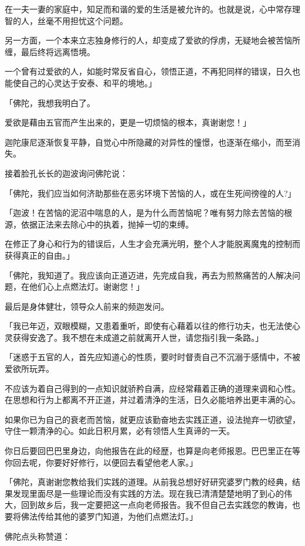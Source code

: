 \documentclass[twoside,openany]{book}
\begin{document}
在一夫一妻的家庭中，知足而和谐的爱的生活是被允许的。也就是说，心中常存理智的人，丝毫不用担忧这个问题。

另一方面，一个本来立志独身修行的人，却变成了爱欲的俘虏，无疑地会被苦恼所缠，最后终将远离悟境。

一个曾有过爱欲的人，如能时常反省自心，领悟正道，不再犯同样的错误，日久也能使自己的心灵达于安泰、和平的境地。」

「佛陀，我想我明白了。

爱欲是藉由五官而产生出来的，更是一切烦恼的根本，真谢谢您！」

迦陀康尼逐渐恢复平静，自觉心中所隐藏的对异性的憧憬，也逐渐在缩小，而至消失。

接着脸孔长长的迦波询问佛陀说：

「佛陀，我们应当如何济助那些在恶劣环境下苦恼的人，或在生死间徬徨的人?」

「迦波！在苦恼的泥沼中喘息的人，是为什么而苦恼呢？唯有努力除去苦恼的根源，依据正法来去除心中的执着，抛掉一切的束缚。

在修正了身心和行为的错误后，人生才会充满光明，整个人才能脱离魔鬼的控制而获得真正的自由。」

「佛陀，我知道了。我应该向正道迈进，先完成自我，再去为煎熬痛苦的人解决问题，在他们心上点燃法灯。谢谢您！」

最后是身体健壮，领导众人前来的频迦发问。

「我已年迈，双眼模糊，又患着重听，即使有心藉着以往的修行功夫，也无法使心灵获得安逸了。我不想在未成道之前就离开人世，请您指引我一条路。」

「迷惑于五官的人，首先应知道心的性质，要时时督责自己不沉溺于感情中，不被爱欲所玩弄。

不应该为着自己得到的一点知识就骄矜自满，应经常藉着正确的道理来调和心性。在思想和行为上都离不开正道，并过着清浄的生活，日久必能培养出更丰满的心。

如果你已为自己的衰老而苦恼，就更应该勤奋地去实践正道，设法抛弃一切欲望，守住一颗清浄的心。如此日积月累，必有领悟人生真谛的一天。

你日后要回巴巴里身边，向他报告在此的经歴，也算是向老师报恩。巴巴里正在等你回去呢，你要好好修行，以便回去看望他老人家。」

「佛陀，真谢谢您教给我们实践的道理。从前我总想好好研究婆罗门教的经典，结果发现里面尽是一些理论而没有实践的方法。现在我已清清楚楚地明了到心的伟大，回到故乡后，我一定要把这一点向老师报告。我不但自己去实践您的教诲，也要将佛法传给其他的婆罗门知道，为他们点燃法灯。」

佛陀点头称赞道：
\end{document}
